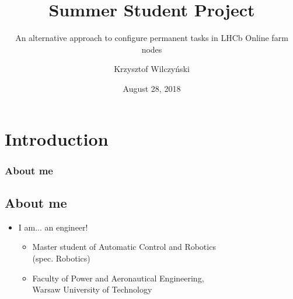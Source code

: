 \documentclass{beamer}
\title{Summer Student Project}
\subtitle{An alternative approach to configure permanent tasks in LHCb Online farm nodes}
\author{Krzysztof Wilczyński}
\date{August 28, 2018}
\institute{Supervisors: Markus Frank, Beat Jost}
\begin{document}
\begin{frame}[plain,t]
\titlepage
\end{frame}


\section{Introduction}
\begin{frame}
\frametitle{About me}
\subsection{About me}

\begin{center}
\begin{itemize}
\item I am... an engineer!
	\begin{itemize}
	\item Master student of Automatic Control and Robotics\\ 			(spec. Robotics)
	\item Faculty of Power and Aeronautical Engineering, \\
    	Warsaw University of Technology
	\end{itemize}
\end{itemize}
\end{center}


\end{frame}
\end{document}
